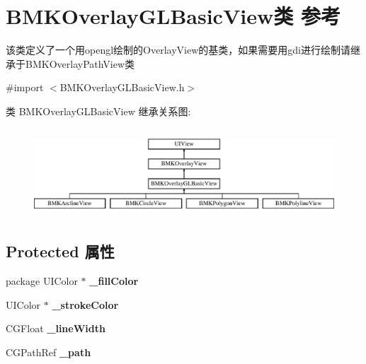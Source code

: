 \hypertarget{interface_b_m_k_overlay_g_l_basic_view}{}\section{B\+M\+K\+Overlay\+G\+L\+Basic\+View类 参考}
\label{interface_b_m_k_overlay_g_l_basic_view}


该类定义了一个用opengl绘制的\+Overlay\+View的基类，如果需要用gdi进行绘制请继承于\+B\+M\+K\+Overlay\+Path\+View类  




{\ttfamily \#import $<$B\+M\+K\+Overlay\+G\+L\+Basic\+View.\+h$>$}

类 B\+M\+K\+Overlay\+G\+L\+Basic\+View 继承关系图\+:\begin{figure}[H]
\begin{center}
\leavevmode
\includegraphics[height=3.333333cm]{interface_b_m_k_overlay_g_l_basic_view}
\end{center}
\end{figure}
\subsection*{Protected 属性}
\begin{DoxyCompactItemize}
\item 
\hypertarget{interface_b_m_k_overlay_g_l_basic_view_a8adee647cc7ac0f196b7603405369ea7}{}package U\+I\+Color $\ast$ {\bfseries \+\_\+fill\+Color}\label{interface_b_m_k_overlay_g_l_basic_view_a8adee647cc7ac0f196b7603405369ea7}

\item 
\hypertarget{interface_b_m_k_overlay_g_l_basic_view_a1d4374c8eab668cec99c7440f04d9797}{}U\+I\+Color $\ast$ {\bfseries \+\_\+stroke\+Color}\label{interface_b_m_k_overlay_g_l_basic_view_a1d4374c8eab668cec99c7440f04d9797}

\item 
\hypertarget{interface_b_m_k_overlay_g_l_basic_view_a16d048b6d3c2d01cc2e66aa7e369b722}{}C\+G\+Float {\bfseries \+\_\+line\+Width}\label{interface_b_m_k_overlay_g_l_basic_view_a16d048b6d3c2d01cc2e66aa7e369b722}

\item 
\hypertarget{interface_b_m_k_overlay_g_l_basic_view_ad0bc8178da7b75c866b8425f49eeecc9}{}C\+G\+Path\+Ref {\bfseries \+\_\+path}\label{interface_b_m_k_overlay_g_l_basic_view_ad0bc8178da7b75c866b8425f49eeecc9}

\end{DoxyCompactItemize}
